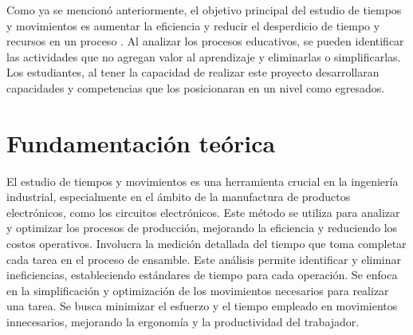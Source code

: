     Como ya se mencionó anteriormente, el objetivo principal del estudio de tiempos y movimientos es aumentar la eficiencia y reducir el desperdicio de tiempo y recursos en un proceso . Al analizar los procesos educativos, se pueden identificar las actividades que no agregan valor al aprendizaje y eliminarlas o simplificarlas.
    Los estudiantes, al tener la capacidad de realizar este proyecto desarrollaran capacidades y competencias que los posicionaran en un nivel como egresados.
    \section{Fundamentación teórica}
    
    El estudio de tiempos y movimientos es una herramienta crucial en la ingeniería industrial, especialmente en el ámbito de la manufactura de productos electrónicos, como los circuitos electrónicos. Este método se utiliza para analizar y optimizar los procesos de producción, mejorando la eficiencia y reduciendo los costos operativos. Involucra la medición detallada del tiempo que toma completar cada tarea en el proceso de ensamble. Este análisis permite identificar y eliminar ineficiencias, estableciendo estándares de tiempo para cada operación. Se enfoca en la simplificación y optimización de los movimientos necesarios para realizar una tarea. Se busca minimizar el esfuerzo y el tiempo empleado en movimientos innecesarios, mejorando la ergonomía y la productividad del trabajador.
    
